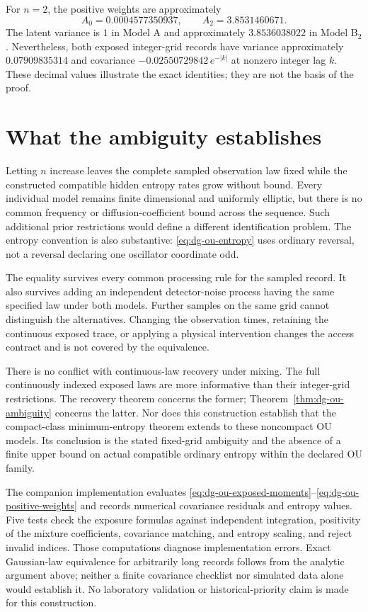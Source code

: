 For $n=2$, the positive weights are approximately
\[
 A_0=0.0004577350937,\qquad A_2=3.8531460671.
\]
The latent variance is $1$ in Model A and approximately $3.8536038022$
in Model B$_2$. Nevertheless, both exposed integer-grid records have
variance approximately $0.07909835314$ and covariance
$-0.02550729842\,e^{-|k|}$ at nonzero integer lag $k$.
These decimal values illustrate the exact identities; they are not the
basis of the proof.

\section{What the ambiguity establishes}

Letting $n$ increase leaves the complete sampled observation law fixed
while the constructed compatible hidden entropy rates grow without bound.
Every individual model remains finite dimensional and uniformly elliptic,
but there is no common frequency or diffusion-coefficient bound across
the sequence. Such additional prior restrictions would define a different
identification problem. The entropy convention is also substantive:
\eqref{eq:dg-ou-entropy} uses ordinary reversal, not a reversal declaring
one oscillator coordinate odd.

The equality survives every common processing rule for the sampled record.
It also survives adding an independent detector-noise process having the
same specified law under both models. Further samples on the same grid
cannot distinguish the alternatives. Changing the observation times,
retaining the continuous exposed trace, or applying a physical intervention
changes the access contract and is not covered by the equivalence.

There is no conflict with continuous-law recovery under mixing. The
full continuously indexed exposed laws are more informative than their
integer-grid restrictions. The recovery theorem concerns the former;
Theorem~\ref{thm:dg-ou-ambiguity} concerns the latter. Nor does this
construction establish that the compact-class minimum-entropy theorem
extends to these noncompact OU models. Its conclusion is the stated
fixed-grid ambiguity and the absence of a finite upper bound on actual
compatible ordinary entropy within the declared OU family.

The companion implementation evaluates
\eqref{eq:dg-ou-exposed-moments}--\eqref{eq:dg-ou-positive-weights} and
records numerical covariance residuals and entropy values. Five tests
check the exposure formulas against independent integration, positivity
of the mixture coefficients, covariance matching, and entropy scaling,
and reject invalid indices. Those computations diagnose implementation
errors. Exact Gaussian-law equivalence for arbitrarily long records follows
from the analytic argument above; neither a finite covariance checklist
nor simulated data alone would establish it. No laboratory validation or
historical-priority claim is made for this construction.

